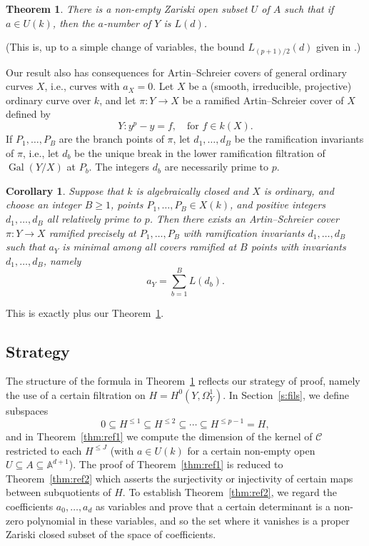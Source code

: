 \documentclass[12pt,reqno]{amsart}
\numberwithin{equation}{section}
\theoremstyle{plain}
\newtheorem{thm}[subsection]{Theorem}
\newtheorem{cor}[subsection]{Corollary}
\theoremstyle{definition}
\theoremstyle{remark}
\numberwithin{equation}{section}
\newcommand{\CC}{\mathcal{C}}
\newcommand{\A}{\mathbb{A}}
\newcommand{\<}{\langle}
\renewcommand{\>}{\rangle}
\DeclareMathOperator{\gal}{Gal}
\begin{document}
\begin{thm}\label{thm:main}
  There is a non-empty Zariski open subset $U$ of $A$ such that if $a\in
  U(k)$, then the $a$-number of $Y$ is $L(d)$.
\end{thm}

(This is, up to a simple change of variables, the bound
$L_{(p+1)/2}(d)$ given in \cite{BooherPriesetal22}.)

Our result also has consequences for Artin--Schreier covers of general
ordinary curves $X$, i.e., curves with $a_X=0$.  Let $X$ be a (smooth,
irreducible, projective) ordinary curve over $k$, and
let $\pi:Y\to X$ be a ramified Artin--Schreier cover of $X$ defined by
\[Y: y^p-y=f,\quad\text{for $f\in k(X)$}.\]
If $P_1,\dots,P_B$ are the branch points of $\pi$, let $d_1,\dots,d_B$
be the ramification invariants of $\pi$, i.e., let $d_b$ be the
unique break in the lower ramification filtration of $\gal(Y/X)$ at
$P_b$.
The integers $d_b$ are necessarily prime to $p$.

\begin{cor}
  Suppose that $k$ is algebraically closed and $X$ is ordinary, and
  choose an integer $B\ge 1$, points $P_1,\dots,P_B\in X(k)$, and positive
  integers $d_1,\dots,d_B$ all relatively prime to $p$.  Then there
  exists an Artin--Schreier cover $\pi:Y\to X$ ramified precisely at
  $P_1,\dots,P_B$ with ramification invariants $d_1,\dots,d_B$ such
  that $a_Y$ is minimal among all covers ramified at $B$ points with
  invariants $d_1,\dots,d_B$, namely
  \[a_Y= \sum_{b=1}^B L(d_b).\]
\end{cor}

This is exactly \cite[Thm.~1.2]{BooherPriesetal22} plus our
Theorem~\ref{thm:main}. 

\subsection{Strategy}
The structure of the formula in Theorem~\ref{thm:main} reflects our
strategy of proof, namely the use of a certain filtration on
$H=H^0(Y,\Omega^1_Y)$.  In Section~\ref{s:fils}, we define subspaces
\[0\subseteq H^{\le1}\subseteq H^{\le2}\subseteq\cdots\subseteq H^{\le
    p-1}=H,\]
and in Theorem~\ref{thm:ref1} we compute the dimension of the
kernel of $\CC$ restricted to each $H^{\le J}$ (with $a\in U(k)$ for a certain
non-empty open $U\subseteq A\subseteq\A^{d+1}$).  The proof of
Theorem~\ref{thm:ref1} is reduced to Theorem~\ref{thm:ref2} which
asserts the surjectivity or injectivity of certain maps between
subquotients of $H$.  To establish Theorem~\ref{thm:ref2}, we regard
the coefficients $a_0,\dots,a_d$ as variables and prove that a certain
determinant is a non-zero polynomial in these variables, and so the
set where it vanishes is a proper Zariski closed subset of the space
of coefficients.
\end{document}
